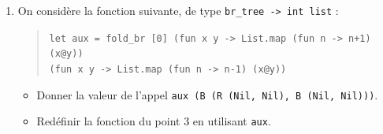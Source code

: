\documentclass{article}
\begin{document}
{\begin{enumerate}
        \item On considère la fonction suivante, de type \texttt{br\_tree -> int list} :
        \begin{quote}
        \texttt{let aux = fold\_br [0] (fun x y -> List.map (fun n -> n+1) (x@y))}\\
        \texttt{\phantom{XXXXXXXXXXXXXXXXX}(fun x y -> List.map (fun n -> n-1) (x@y))}
        \end{quote}
        \begin{itemize}
            \item Donner la valeur de l'appel \texttt{aux (B (R (Nil, Nil), B (Nil, Nil)))}.
            \item Redéfinir la fonction du point 3 en utilisant \texttt{aux}.
        \end{itemize}
    \end{enumerate}
}
\end{document}
